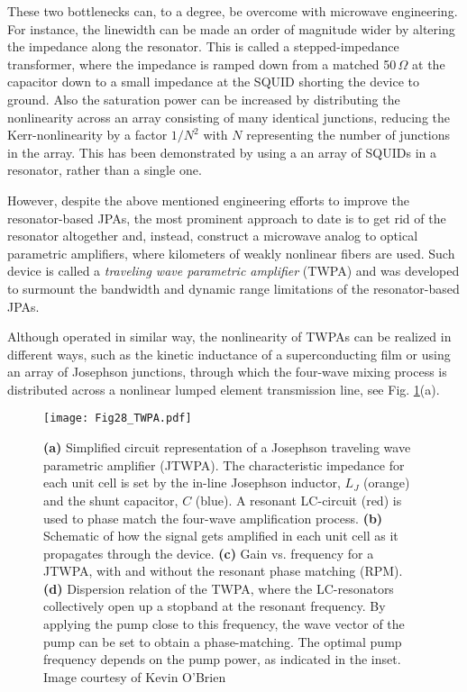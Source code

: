 \documentclass[aip,apr,twocolumn,showpacs,superscriptaddress,groupedaddress,nofootinbib,reprint]{revtex4-1}  %
\begin{document}
These two bottlenecks can, to a degree, be overcome with microwave engineering. For instance, the linewidth can be made an order of magnitude wider by altering the impedance along the resonator. This is called a stepped-impedance transformer, where the impedance is ramped down from a matched 50$\,\Omega$ at the capacitor down to a small impedance at the SQUID\cite{Roy2015} shorting the device to ground. Also the saturation power can be increased by distributing the nonlinearity across an array consisting of many identical junctions, reducing the Kerr-nonlinearity by a factor $1/N^2$ with $N$ representing the number of junctions in the array. This has been demonstrated by using a an array of SQUIDs in a resonator, rather than a single one\cite{Castellanos-Beltran2008}.

However, despite the above mentioned engineering efforts to improve the resonator-based JPAs, the most prominent approach to date is to get rid of the resonator altogether and, instead, construct a microwave analog to optical parametric amplifiers, where kilometers of weakly nonlinear fibers are used. Such device is called a \textit{traveling wave parametric amplifier} (TWPA) and was developed to surmount the bandwidth and dynamic range limitations of the resonator-based JPAs.

Although operated in similar way, the nonlinearity of TWPAs can be realized in different ways, such as the kinetic inductance of a superconducting film\cite{Eom2012,Bockstiegel2014,Adamyan2016} or using an array of Josephson junctions\cite{OBrien2014,Macklin2015,White2015}, through which the four-wave mixing process is distributed across a nonlinear lumped element transmission line, see Fig. \ref{Fig:TWPA}(a).

\begin{figure}[t!]
\begin{center}
\texttt{[image: Fig28\_TWPA.pdf]}
\caption{\textbf{(a)} Simplified circuit representation of a Josephson traveling wave parametric amplifier (JTWPA). The characteristic impedance for each unit cell is set by the in-line Josephson inductor, $L_J$ (orange) and the shunt capacitor, $C$ (blue). A resonant LC-circuit (red) is used to phase match the four-wave amplification process. \textbf{(b)} Schematic of how the signal gets amplified in each unit cell as it propagates through the device. \textbf{(c)} Gain vs. frequency for a JTWPA, with and without the resonant phase matching (RPM). \textbf{(d)} Dispersion relation of the TWPA, where the LC-resonators collectively open up a stopband at the resonant frequency. By applying the pump close to this frequency, the wave vector of the pump can be set to obtain a phase-matching. The optimal pump frequency depends on the pump power, as indicated in the inset. Image courtesy of Kevin O'Brien\cite{OBrien2014,Macklin2015}}
\label{Fig:TWPA}
\end{center}
\end{figure}
\end{document}
